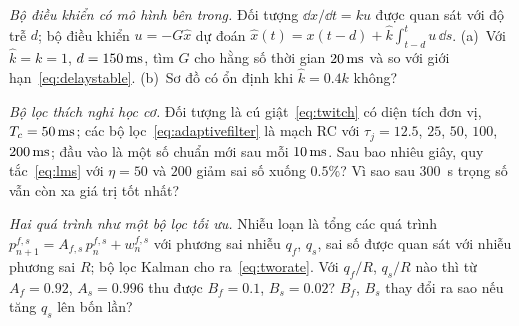 \begin{exercise}[\lvlB]
\label{ex:15:5}
\emph{Bộ điều khiển có mô hình bên trong.} Đối tượng $\dd x/\dd t=ku$ được quan sát với độ trễ $d$; bộ điều khiển $u=-G\hat x$ dự đoán $\hat x(t)=x(t-d)+\hat k\int_{t-d}^{t}u\,\dd s$. (a)~Với $\hat k=k=1$, $d=150\,\text{ms}$, tìm $G$ cho hằng số thời gian $20\,\text{ms}$ và so với giới hạn~\eqref{eq:delaystable}. (b)~Sơ đồ có ổn định khi $\hat k=0.4k$ không?
\end{exercise}

\begin{exercise}[\lvlB]
\label{ex:15:6}
\emph{Bộ lọc thích nghi học cơ.} Đối tượng là cú giật~\eqref{eq:twitch} có diện tích đơn vị, $T_c=50\,\text{ms}$; các bộ lọc~\eqref{eq:adaptivefilter} là mạch RC với $\tau_j=12.5$, $25$, $50$, $100$, $200\,\text{ms}$; đầu vào là một số chuẩn mới sau mỗi $10\,\text{ms}$. Sau bao nhiêu giây, quy tắc~\eqref{eq:lms} với $\eta=50$ và $200$ giảm sai số xuống $0.5\%$? Vì sao sau $300$~s trọng số vẫn còn xa giá trị tốt nhất?
\end{exercise}

\begin{exercise}[\lvlC]
\label{ex:15:7}
\emph{Hai quá trình như một bộ lọc tối ưu.} Nhiễu loạn là tổng các quá trình $p^{f,s}_{n+1}=A_{f,s}\,p^{f,s}_n+w^{f,s}_n$ với phương sai nhiễu $q_f$, $q_s$, sai số được quan sát với nhiễu phương sai $R$; bộ lọc Kalman cho ra~\eqref{eq:tworate}. Với $q_f/R$, $q_s/R$ nào thì từ $A_f=0.92$, $A_s=0.996$ thu được $B_f=0.1$, $B_s=0.02$? $B_f$, $B_s$ thay đổi ra sao nếu tăng $q_s$ lên bốn lần?
\end{exercise}
